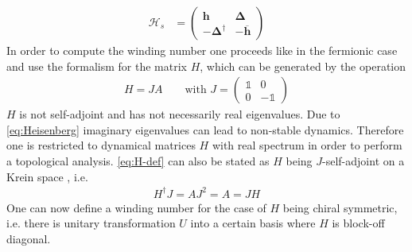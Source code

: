 \begin{align*}
    \mathcal{H}_s&=\begin{pmatrix} \mathbf{h} & \mathbf{\Delta} \\ -\mathbf{\Delta^\dagger} & -\overline{\mathbf{h}} \end{pmatrix} 
\end{align*}
In order to compute the winding number one proceeds like in the fermionic case and use the formalism for the matrix $H$, which can be generated by the operation 
\begin{align}\label{eq:H-def}
    H= JA\qquad \text{with }J=\begin{pmatrix}   
        \mathbb{1} & 0 \\
            0 & -\mathbb{1} 
    \end{pmatrix}
\end{align}
$H$ is not self-adjoint and has not necessarily real eigenvalues. Due to \eqref{eq:Heisenberg} imaginary eigenvalues can lead to non-stable dynamics. Therefore one is restricted to dynamical matrices $H$ with real spectrum in order to perform a topological analysis. \eqref{eq:H-def} can also be stated as $H$ being $J$-self-adjoint on a Krein space \cite{peanoTopologicalEdgeStates2018}, i.e.
\begin{align*}
    H^\dagger J = A J^2 = A = J H
\end{align*}
One can now define a winding number for the case of $H$ being chiral symmetric, i.e. there is unitary transformation $U$ into a certain basis where $H$ is block-off diagonal.






